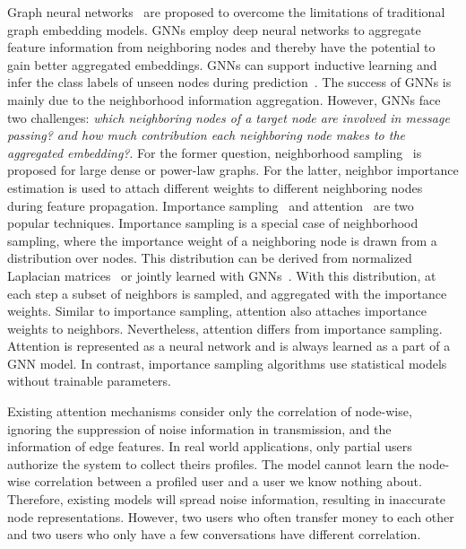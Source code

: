 \documentclass[runningheads]{llncs}
\begin{document}
Graph neural networks~\cite{kipf2016semi,hamilton2017inductive,velivckovic2017graph} are proposed to overcome the limitations of traditional graph embedding models.
GNNs employ deep neural networks to aggregate feature information from neighboring nodes and thereby have the potential to gain better aggregated embeddings.
GNNs can support inductive learning and infer the class labels of unseen nodes during prediction~\cite{hamilton2017inductive,velivckovic2017graph}.
The success of GNNs is mainly due to the neighborhood information aggregation. However, 
GNNs face two challenges: \textit{which neighboring nodes of a target node are involved in message passing? and how much contribution each neighboring node makes to the aggregated embedding?}.
For the former question, neighborhood sampling~\cite{hamilton2017inductive,ying2018graph,chen2018fastgcn,huang2018adaptive,zou2019layer,ji2020accelerating} is proposed for large dense or power-law graphs.
For the latter, neighbor importance estimation is used to attach different weights to different neighboring nodes during feature propagation.
Importance sampling~\cite{chen2018fastgcn,zou2019layer,ji2020accelerating} and attention~\cite{velivckovic2017graph,liu2019geniepath,wang2019heterogeneous,yun2019graph,hu2020heterogeneous} are two popular techniques.
Importance sampling is a special case of neighborhood sampling, where the importance weight of a neighboring node is drawn from a distribution over nodes.
This distribution can be derived from normalized Laplacian matrices~\cite{chen2018fastgcn,zou2019layer} or jointly learned with GNNs~\cite{ji2020accelerating}.
With this distribution, at each step a subset of neighbors is sampled, and aggregated with the importance weights.
Similar to importance sampling, attention also attaches importance weights to neighbors.
Nevertheless, attention differs from importance sampling.
Attention is represented as a neural network and is always learned as a part of a GNN model.
In contrast, importance sampling algorithms use statistical models without trainable parameters.

Existing attention mechanisms consider only the correlation of node-wise, ignoring the suppression of noise information in transmission, and the information of edge features. In real world applications, only partial users authorize the system to collect theirs profiles. The model cannot learn the node-wise correlation between a profiled user and a user we know nothing about.  Therefore, existing models will spread noise information, resulting in inaccurate node representations. However, two users who often transfer money to each other and two users who only have a few conversations have different correlation. 
\end{document}

